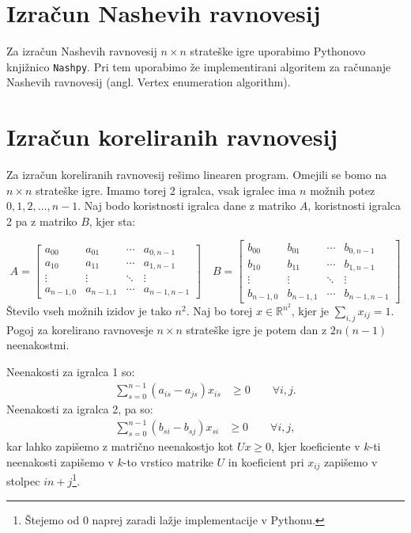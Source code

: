 \documentclass{article}
\begin{document}
\section{Izračun Nashevih ravnovesij}
Za izračun Nashevih ravnovesij $n \times n$ strateške igre uporabimo Pythonovo knjižnico \texttt{Nashpy}. Pri tem uporabimo že implementirani algoritem za računanje Nashevih ravnovesij (angl. Vertex enumeration algorithm).

\section{Izračun koreliranih ravnovesij}
Za izračun koreliranih ravnovesij rešimo linearen program. Omejili se bomo na $n\times n$ strateške igre. Imamo torej 2 igralca, vsak igralec ima $n$ možnih potez $0,1,2,\dots, n-1$. Naj bodo koristnosti igralca dane z matriko $A$, koristnosti igralca 2 pa z matriko $B$, kjer sta:

\[
A = \begin{bmatrix}
    a_{00} & a_{01} & \cdots & a_{0,n-1} \\
    a_{10} & a_{11} & \cdots & a_{1,n-1} \\
    \vdots & \vdots & \ddots & \vdots \\
    a_{n-1,0} & a_{n-1,1} & \cdots & a_{n-1,n-1}
\end{bmatrix}
\quad
B = \begin{bmatrix}
    b_{00} & b_{01} & \cdots & b_{0,n-1} \\
    b_{10} & b_{11} & \cdots & b_{1,n-1} \\
    \vdots & \vdots & \ddots & \vdots \\
    b_{n-1,0} & b_{n-1,1} & \cdots & b_{n-1,n-1}
\end{bmatrix}
\]
Število vseh možnih izidov je tako $n^2$. Naj bo torej $x \in \mathbb{R}^{n^2}$, kjer je $\sum_{i,j} x_{ij} = 1$. Pogoj za korelirano ravnovesje $n\times n$ strateške igre je potem dan z $2n(n-1)$ neenakostmi.

Neenakosti za igralca 1 so:
\begin{align*}
    \sum_{s = 0}^{n-1} (a_{is} - a_{js})x_{is} &\geq 0 \qquad \forall i,j.
\end{align*}
Neenakosti za igralca 2, pa so:
\begin{align*}
    \sum_{s = 0}^{n-1} (b_{si} - b_{sj})x_{si} &\geq 0 \qquad \forall i,j,
\end{align*}
kar lahko zapišemo z matrično neenakostjo kot $U x \geq 0$, kjer koeficiente v $k$-ti neenakosti zapišemo v $k$-to vrstico matrike $U$ in koeficient pri $x_{ij}$ zapišemo v stolpec $in + j$\footnote{Štejemo od 0 naprej zaradi lažje implementacije v Pythonu.}.
\end{document}
